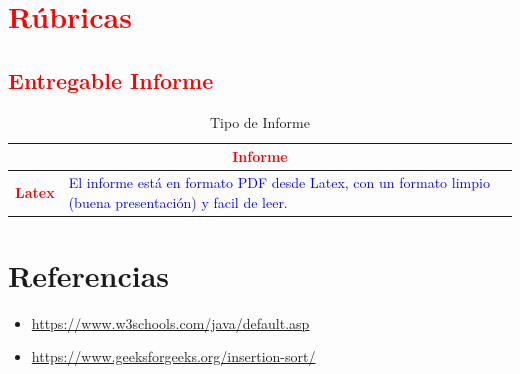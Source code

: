 \documentclass{article}
\begin{document}
\clearpage

	\section{\textcolor{red}{Rúbricas}}
	
	\subsection{\textcolor{red}{Entregable Informe}}
	\begin{table}[H]
		\caption{Tipo de Informe}
		\setlength{\tabcolsep}{0.5em} %
		{\renewcommand{\arraystretch}{1.5}%
		\begin{tabular}{|p{3cm}|p{12cm}|}
			\hline
			\multicolumn{2}{|c|}{\textbf{\textcolor{red}{Informe}}}  \\
			\hline 
			\textbf{\textcolor{red}{Latex}} & \textcolor{blue}{El informe está en formato PDF desde Latex,  con un formato limpio (buena presentación) y facil de leer.}   \\ 
			\hline 
			
			
		\end{tabular}
	}
	\end{table}
	
	\clearpage
	
	
	
\clearpage

\section{Referencias}
\begin{itemize}			
	\item \url{https://www.w3schools.com/java/default.asp}
	\item \url{https://www.geeksforgeeks.org/insertion-sort/}
\end{itemize}	
	
%
%
%
\end{document}
